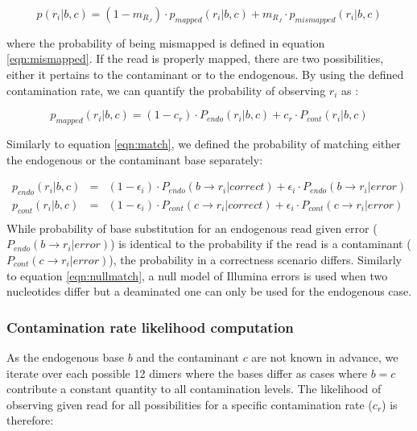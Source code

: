 \documentclass[a4paper,12pt]{article}
\begin{document}
\begin{itemize}
\begin{itemize}
\begin{equation}
p(r_i|b,c)  = (1-m_{R_J}) \cdot p_{mapped}(r_i|b,c) + m_{R_J} \cdot p_{mismapped}(r_i|b,c)  
\label{eqn:singlereadcont}
\end{equation}

\noindent where the probability of being mismapped is defined in equation \ref{eqn:mismapped}. If the read is properly mapped, there are two possibilities, either it pertains to the contaminant or to the endogenous. By using the defined contamination rate, we can quantify the probability of observing $r_i$ as :

\begin{equation}
p_{mapped}(r_i|b,c) = (1-c_r) \cdot P_{endo} (r_i|b,c)   + c_r \cdot P_{cont} (r_i|b,c)
\end{equation}

\noindent Similarly to equation \ref{eqn:match}, we defined the probability of matching either the endogenous or the contaminant base separately:

{\small
\begin{eqnarray}
  p_{endo}(r_i|b,c)   & = &  (1-\epsilon_i ) \cdot  P_{endo}( b \to r_i|correct) +  \epsilon_i \cdot P_{endo}(  b \to r_i |error)   \\
  p_{cont}(r_i|b,c)   & = &  (1-\epsilon_i ) \cdot  P_{cont}( c \to r_i|correct) +  \epsilon_i \cdot P_{cont}(  c \to r_i |error)   \\
\end{eqnarray} 
}
\noindent While probability of base substitution for an endogenous read given error ($P_{endo}(  b \to r_i |error)$) is identical to the probability if the read is a contaminant ($P_{cont}(  c \to r_i |error)$), the probability in a correctness scenario differs. Similarly to equation \ref{eqn:nullmatch}, a null model of Illumina errors is used when two nucleotides differ but a deaminated one can only be used for the endogenous case. 

\subsubsection{Contamination rate likelihood computation}

As the endogenous base $b$ and the contaminant $c$ are not known in advance, we iterate over each possible 12 dimers where the bases differ as cases where $b=c$ contribute a constant quantity to all contamination levels. The likelihood of observing given read for all possibilities for a specific contamination rate ($c_r$) is therefore:


\end{itemize}
\end{itemize}
\end{document}
